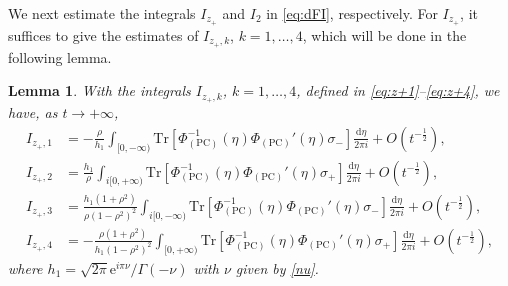 \documentclass[11pt,a4paper]{article}
\newtheorem{lemma}[thm]{Lemma}
\numberwithin{equation}{section}
\begin{document}
We next estimate the integrals $I_{z_+}$ and $I_2$ in  \eqref{eq:dFI}, respectively. For $I_{z_+}$, it suffices to give the estimates of $I_{z_+,k}$, $k=1,\ldots,4$, which will be done in the following lemma.
\begin{lemma}\label{I-z+-expre}
With the integrals $I_{z_+,k}$, $k=1,\ldots,4$, defined in \eqref{eq:z+1}--\eqref{eq:z+4}, we have, as $t\to+\infty$,
\begin{align}
I_{z_+,1}&=-\frac{\rho}{h_1}\int_{[0,-\infty)}
\mathrm{Tr}\left[\Phi_{(\mathrm{PC})}^{-1}(\eta)\Phi_{(\mathrm{PC})}'(\eta)
\sigma_-\right]\frac{\mathrm{d}\eta}{2\pi i}+O\left(t^{-\frac{1}{2}}\right),\label{eq:estIz+1}\\
I_{z_+,2}&=\frac{h_1}{\rho}\int_{i[0,+\infty)}
\mathrm{Tr}\left[\Phi_{(\mathrm{PC})}^{-1}(\eta)\Phi_{(\mathrm{PC})}'(\eta)
\sigma_+\right]\frac{\mathrm{d}\eta}{2\pi i}+O\left(t^{-\frac{1}{2}}\right),\label{eq:estIz+2}\\
I_{z_+,3}&=\frac{h_1(1+\rho^2)}{\rho(1-\rho^2)^2}\int_{i[0,-\infty)}
\mathrm{Tr}\left[\Phi_{(\mathrm{PC})}^{-1}(\eta)\Phi_{(\mathrm{PC})}'(\eta)
\sigma_-\right]\frac{\mathrm{d}\eta}{2\pi i}+O\left(t^{-\frac{1}{2}}\right),\label{eq:estIz+3}\\
I_{z_+,4}&=-\frac{\rho(1+\rho^2)}{h_1(1-\rho^2)^2}\int_{[0,+\infty)}
\mathrm{Tr}\left[\Phi_{(\mathrm{PC})}^{-1}(\eta)\Phi_{(\mathrm{PC})}'(\eta)
\sigma_+\right]\frac{\mathrm{d}\eta}{2\pi i}+O\left(t^{-\frac{1}{2}}\right),\label{eq:estIz+4}
\end{align}
where $h_1=\sqrt{2\pi}\mathrm{e}^{i\pi\nu}/\Gamma(-\nu)$ with $\nu$ given by \eqref{nu}.
\end{lemma}
\end{document}
